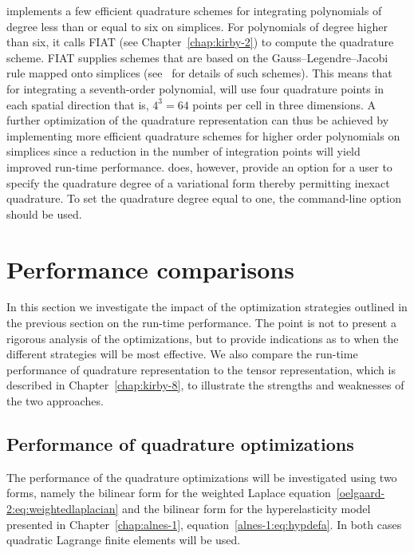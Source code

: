 \ffc{} implements a few efficient quadrature schemes for integrating
polynomials of degree less than or equal to six on simplices.
For polynomials of degree higher than six, it calls FIAT
(see Chapter~\ref{chap:kirby-2}) to compute the quadrature scheme.
FIAT supplies schemes that are based on the Gauss--Legendre--Jacobi rule mapped
onto simplices (see~\citet{KarniadakisSherwin2005} for details of such
schemes).
This means that for integrating a seventh-order polynomial, \ffc{}
will use four quadrature points in each spatial direction that is, $4^3
= 64$ points per cell in three dimensions.  A further optimization of
the quadrature representation can thus be achieved by implementing
more efficient quadrature schemes for higher order polynomials on simplices
since a reduction in
the number of integration points will yield improved run-time
performance.  \ffc{} does, however, provide an option for a user to
specify the quadrature degree of a variational form thereby permitting
inexact quadrature.  To set the quadrature degree equal to one, the
command-line option  should be used.

\vspace*{10pt}

\section{Performance comparisons}

In this section we investigate the impact of the optimization
strategies outlined in the previous section on the run-time
performance. The point is not to present a rigorous analysis of the
optimizations, but to provide indications as to when the different
strategies will be most effective. We also compare the run-time
performance of quadrature representation to the tensor representation,
which is described in Chapter~\ref{chap:kirby-8}, to illustrate the
strengths and weaknesses of the two approaches.

\subsection{Performance of quadrature optimizations}
\label{oelgaard-2:sec:quad_performance}

The performance of the quadrature optimizations will be investigated
using two forms, namely the bilinear form for the weighted Laplace
equation~\eqref{oelgaard-2:eq:weightedlaplacian} and the bilinear form
for the hyperelasticity model presented in Chapter~\ref{chap:alnes-1},
equation~\eqref{alnes-1:eq:hypdefa}.  In both cases quadratic Lagrange
finite elements will be used.

